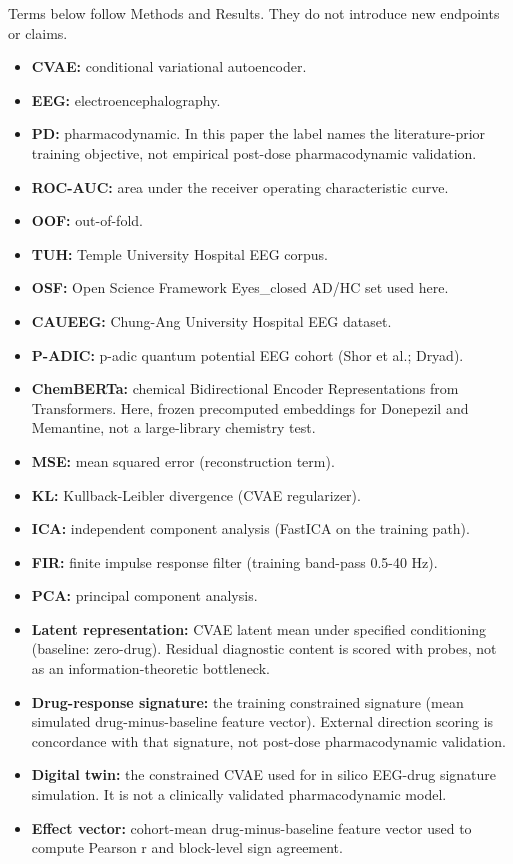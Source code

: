 Terms below follow Methods and Results. They do not introduce new endpoints or claims.


\begin{itemize}
  \item \textbf{CVAE:} conditional variational autoencoder.
  \item \textbf{EEG:} electroencephalography.
  \item \textbf{PD:} pharmacodynamic. In this paper the label names the literature-prior training objective, not empirical post-dose pharmacodynamic validation.
  \item \textbf{ROC-AUC:} area under the receiver operating characteristic curve.
  \item \textbf{OOF:} out-of-fold.
  \item \textbf{TUH:} Temple University Hospital EEG corpus.
  \item \textbf{OSF:} Open Science Framework Eyes\_closed AD/HC set used here.
  \item \textbf{CAUEEG:} Chung-Ang University Hospital EEG dataset.
  \item \textbf{P-ADIC:} p-adic quantum potential EEG cohort (Shor et al.; Dryad).
  \item \textbf{ChemBERTa:} chemical Bidirectional Encoder Representations from Transformers. Here, frozen precomputed embeddings for Donepezil and Memantine, not a large-library chemistry test.
  \item \textbf{MSE:} mean squared error (reconstruction term).
  \item \textbf{KL:} Kullback-Leibler divergence (CVAE regularizer).
  \item \textbf{ICA:} independent component analysis (FastICA on the training path).
  \item \textbf{FIR:} finite impulse response filter (training band-pass 0.5-40 Hz).
  \item \textbf{PCA:} principal component analysis.
  \item \textbf{Latent representation:} CVAE latent mean under specified conditioning (baseline: zero-drug). Residual diagnostic content is scored with probes, not as an information-theoretic bottleneck.
  \item \textbf{Drug-response signature:} the training constrained signature (mean simulated drug-minus-baseline feature vector). External direction scoring is concordance with that signature, not post-dose pharmacodynamic validation.
  \item \textbf{Digital twin:} the constrained CVAE used for in silico EEG-drug signature simulation. It is not a clinically validated pharmacodynamic model.
  \item \textbf{Effect vector:} cohort-mean drug-minus-baseline feature vector used to compute Pearson r and block-level sign agreement.
\end{itemize}


